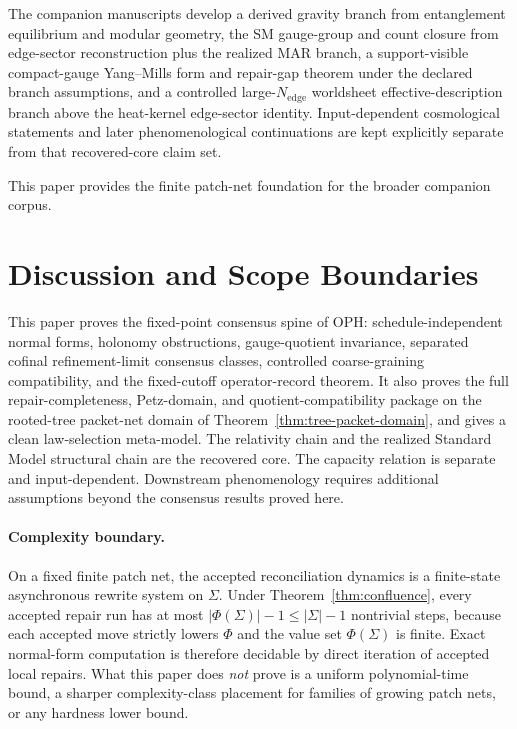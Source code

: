 \documentclass[11pt]{article}
\theoremstyle{remark}
\theoremstyle{plain}
\begin{document}
The companion manuscripts develop a derived gravity branch from entanglement equilibrium and modular geometry, the SM gauge-group and count closure from edge-sector reconstruction plus the realized MAR branch, a support-visible compact-gauge Yang--Mills form and repair-gap theorem under the declared branch assumptions, and a controlled large-\(N_{\mathrm{edge}}\) worldsheet effective-description branch above the heat-kernel edge-sector identity. Input-dependent cosmological statements and later phenomenological continuations are kept explicitly separate from that recovered-core claim set.

This paper provides the finite patch-net foundation for the broader companion corpus.


\section{Discussion and Scope Boundaries}

This paper proves the fixed-point consensus spine of OPH: schedule-independent normal forms,
holonomy obstructions, gauge-quotient invariance, separated cofinal refinement-limit consensus
classes, controlled coarse-graining compatibility, and the fixed-cutoff operator-record theorem.
It also proves the full repair-completeness, Petz-domain, and quotient-compatibility package on
the rooted-tree packet-net domain of Theorem~\ref{thm:tree-packet-domain}, and gives a clean
law-selection meta-model. The relativity chain and the realized Standard Model
structural chain are the recovered core. The capacity relation is separate and input-dependent.
Downstream phenomenology requires additional assumptions beyond the consensus results proved here.

\paragraph{Complexity boundary.}
On a fixed finite patch net, the accepted reconciliation dynamics is a finite-state asynchronous
rewrite system on \(\Sigma\). Under Theorem~\ref{thm:confluence}, every accepted repair run has at
most \(|\Phi(\Sigma)|-1\le |\Sigma|-1\) nontrivial steps, because each accepted move strictly
lowers \(\Phi\) and the value set \(\Phi(\Sigma)\) is finite. Exact normal-form computation is
therefore decidable by direct iteration of accepted local repairs. What this paper does
\emph{not} prove is a uniform polynomial-time bound, a sharper complexity-class placement for
families of growing patch nets, or any hardness lower bound.
\end{document}
